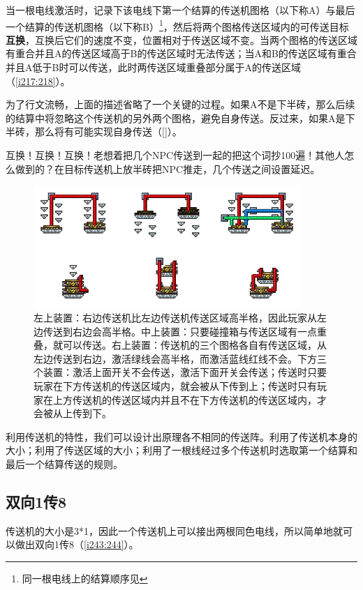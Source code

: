 当一根电线激活时，记录下该电线下第一个结算的传送机图格（以下称A）与最后一个结算的传送机图格（以下称B）\footnote{同一根电线上的结算顺序见}，然后将两个图格传送区域内的可传送目标\textbf{互换}，互换后它们的速度不变，位置相对于传送区域不变。当两个图格的传送区域有重合并且A的传送区域高于B的传送区域时无法传送；当A和B的传送区域有重合并且A低于B时可以传送，此时两传送区域重叠部分属于A的传送区域（\autoref{i217:218}）。

为了行文流畅，上面的描述省略了一个关键的过程。如果A不是下半砖，那么后续的结算中将忽略这个传送机的另外两个图格，避免自身传送。反过来，如果A是下半砖，那么将有可能实现自身传送（\autoref{}）。

\begin{remark}
互换！{\LARGE 互换！}{\huge 互换！}老想着把几个NPC传送到一起的把这个词抄100遍！其他人怎么做到的？在目标传送机上放半砖把NPC推走，几个传送之间设置延迟。
\end{remark}

\begin{figure}[!ht]
\begin{center}
\includegraphics[width=0.9\textwidth]{images/218.png}
\end{center}
\caption{左上装置：右边传送机比左边传送机传送区域高半格，因此玩家从左边传送到右边会高半格。中上装置：只要碰撞箱与传送区域有一点重叠，就可以传送。右上装置：传送机的三个图格各自有传送区域，从左边传送到右边，激活绿线会高半格，而激活蓝线红线不会。下方三个装置：激活上面开关不会传送，激活下面开关会传送；传送时只要玩家在下方传送机的传送区域内，就会被从下传到上；传送时只有玩家在上方传送机的传送区域内并且不在下方传送机的传送区域内，才会被从上传到下。}
\label{i217:218}
\end{figure}

利用传送机的特性，我们可以设计出原理各不相同的传送阵。利用了传送机本身的大小；利用了传送区域的大小；利用了一根线经过多个传送机时选取第一个结算和最后一个结算传送的规则。

\subsection{双向1传8}\label{sec11}
传送机的大小是3*1，因此一个传送机上可以接出两根同色电线，所以简单地就可以做出双向1传8（\autoref{i243:244}）。

